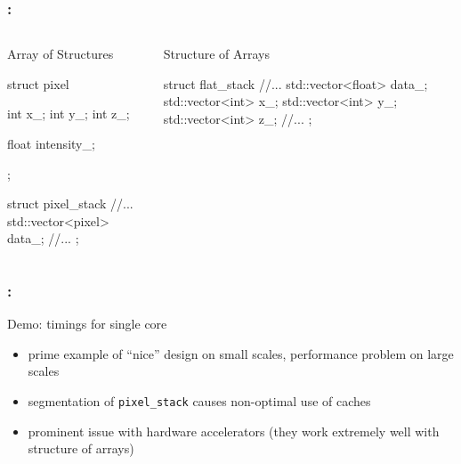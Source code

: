 \documentclass[9pt,xcolor=table]{beamer}
\begin{document}
\begin{frame}[fragile]
  \frametitle{\insertsectionhead{}: \insertsubsectionhead{}}
  \begin{columns}[t]
    \begin{column}{.45\textwidth}
      \begin{block}{Array of Structures}
        \begin{pyglist}[language=c++,numbers=left,style=emacs]
        struct pixel {
      
        int x_;
        int y_;
        int z_;
      
        float intensity_;
      
      };
      
        struct pixel_stack {
        //...
        std::vector<pixel> data_;
        //...
      };
      \end{pyglist}
      \vfill
      \end{block}
    \end{column}
    \pause
    \begin{column}{.45\textwidth}
      \begin{block}{Structure of Arrays}
        \begin{pyglist}[language=c++,numbers=left,style=emacs]
      
        struct flat_stack   {
        //...
        std::vector<float> data_;
        std::vector<int> x_;
        std::vector<int> y_;
        std::vector<int> z_;
        //...
      };
      \end{pyglist}
      \vfill
      \end{block}
    \end{column}
  \end{columns}
\end{frame}

\begin{frame}
\frametitle{\insertsectionhead{}: \insertsubsectionhead{}}
\begin{center}
  \huge Demo: timings for single core
\end{center}
\pause
\begin{itemize}
\item prime example of ``nice'' design on small scales, performance problem on large scales
\item segmentation of \texttt{pixel\_stack} causes non-optimal use of caches
\item prominent issue with hardware accelerators (they work extremely well with structure of arrays)
\end{itemize}
\end{frame}
\end{document}
